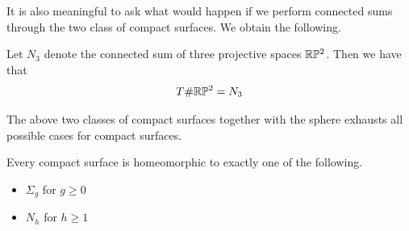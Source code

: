 \documentclass[a4paper]{article}
\begin{document}
It is also meaningful to ask what would happen if we perform connected sums through the two class of compact surfaces. We obtain the following. 

\begin{prp}{}{} Let $N_3$ denote the connected sum of three projective spaces $\mathbb{R}\mathbb{P}^2$. Then we have that $$T\#\mathbb{R}\mathbb{P}^2=N_3$$ 
\end{prp}

The above two classes of compact surfaces together with the sphere exhausts all possible cases for compact surfaces. 

\begin{thm}{}{} Every compact surface is homeomorphic to exactly one of the following. 
\begin{itemize}
\item $\Sigma_g$ for $g\geq 0$
\item $N_h$ for $h\geq 1$
\end{itemize}
\end{thm}
\end{document}
